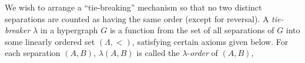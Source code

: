 We wish to arrange a ``tie-breaking'' mechanism so that no two distinct separations are counted as having the same order (except for reversal). A \textit{tie-breaker} $\lambda$ in a hypergraph $G$ is a function from the set of all separations of $G$ into some linearly ordered set $(\Lambda, <)$, satisfying certain axioms given below. For each separation $(A, B)$, $\lambda(A, B)$ is called the $\lambda$-\textit{order} of $(A, B)$,
